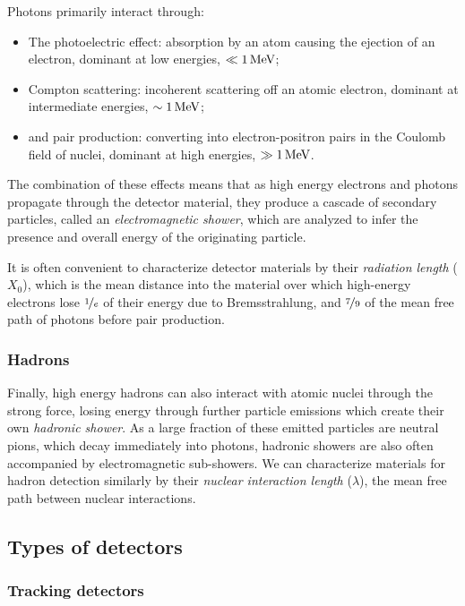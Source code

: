 Photons primarily interact through:
\begin{itemize}
    \item The photoelectric effect: absorption by an atom causing the ejection of an electron, dominant at low energies, $\ll 1\,\text{Me\hspace{-.08em}V}$;
    \item Compton scattering: incoherent scattering off an atomic electron, dominant at intermediate energies, $\sim 1\,\text{Me\hspace{-.08em}V}$;
    \item and pair production: converting into electron-positron pairs in the Coulomb field of nuclei, dominant at high energies, $\gg 1\,\text{Me\hspace{-.08em}V}$.
\end{itemize}
The combination of these effects means that as high energy electrons and photons propagate through the detector material, they produce a cascade of secondary particles, called an \textit{electromagnetic shower}, which are analyzed to infer the presence and overall energy of the originating particle.

It is often convenient to characterize detector materials by their \textit{radiation length} ($X_0$), which is the mean distance into the material over which high-energy electrons lose $\nicefrac{1}{e}$ of their energy due to Bremsstrahlung, and $\nicefrac{7}{9}$ of the mean free path of photons before pair production.

\subsubsection{Hadrons}

Finally, high energy hadrons can also interact with atomic nuclei through the strong force, losing energy through further particle emissions which create their own \textit{hadronic shower}.
As a large fraction of these emitted particles are neutral pions, which decay immediately into photons, hadronic showers are also often accompanied by electromagnetic sub-showers.
We can characterize materials for hadron detection similarly by their \textit{nuclear interaction length} ($\lambda$), the mean free path between nuclear interactions.

\subsection{Types of detectors}
\label{sec:02_cms_detecting_detectors}

\subsubsection{Tracking detectors}

